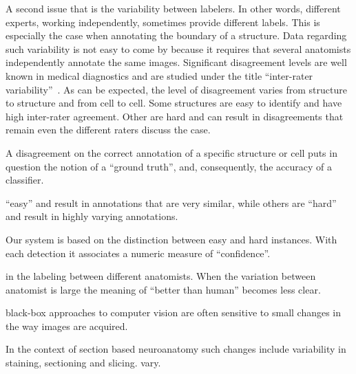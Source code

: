\documentclass[runningheads]{llncs}
\begin{document}
A second issue that is the variability between labelers. In other
words, different experts, working independently, sometimes provide
different labels. This is especially the case when annotating the
boundary of a structure.  Data regarding such variability is not easy
to come by because it requires that several anatomists independently
annotate the same images.  Significant disagreement levels are well
known in medical diagnostics and are studied under the title
``inter-rater variability''~\cite{gellhorn2013inter}. As can be
expected, the level of disagreement varies from structure to structure
and from cell to cell. Some structures are easy to identify and have
high inter-rater agreement. Other are hard and can result in
disagreements that remain even the different raters discuss the case.

A disagreement on the correct annotation of a specific structure or
cell puts in question the notion of a ``ground truth'', and,
consequently, the accuracy of a classifier.






``easy'' and result in annotations that are very similar, while others
are ``hard'' and result in highly varying annotations.

Our system is based on the distinction between easy and hard
instances. With each detection it associates a numeric measure of
``confidence''.


in the labeling between different anatomists. When the variation
between anatomist is large the meaning of ``better than human''
becomes less clear.


black-box approaches to computer vision
are often sensitive to small changes in the way images are acquired.

In the context of section based neuroanatomy such changes include
variability in staining, sectioning and slicing.
vary.
\end{document}

